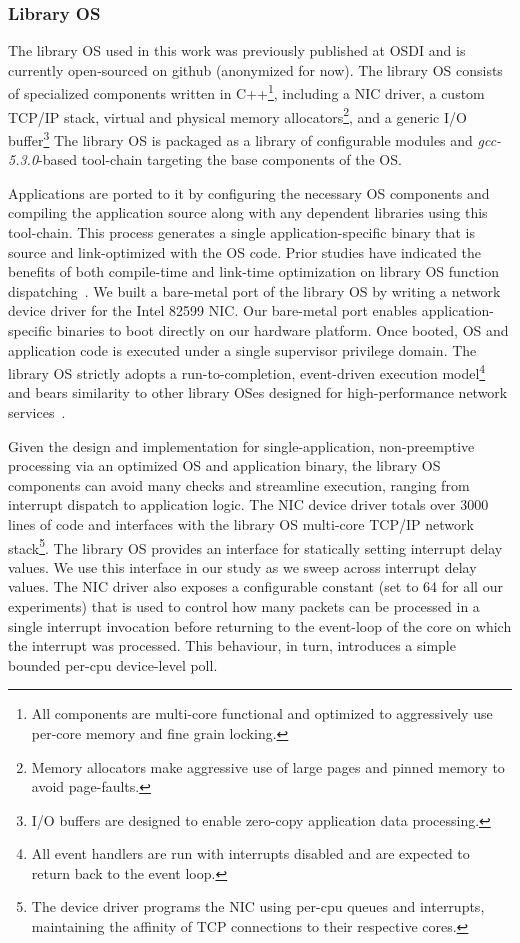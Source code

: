 \subsubsection{Library OS}
\label{sec:OS_libos}
The library OS used in this work was previously published at OSDI and is currently open-sourced on github (anonymized for now). The library OS consists of specialized components written in C++\footnote{ All components are multi-core functional and optimized to aggressively use per-core memory and fine grain locking.}, including a NIC driver, a custom TCP/IP stack, virtual and physical memory allocators\footnote{Memory allocators make aggressive use of large pages and pinned memory to avoid page-faults.}, and a generic I/O buffer\footnote{I/O buffers are designed to enable zero-copy application data processing.} The library OS is packaged as a library of configurable modules and \textit{gcc-5.3.0}-based tool-chain targeting the base components of the OS. 

Applications are ported to it by configuring the necessary OS components and compiling the application source along with any dependent libraries using this tool-chain. This process generates a single application-specific binary that is source and link-optimized with the OS code. Prior studies have indicated the benefits of both compile-time and link-time optimization on library OS function dispatching~\cite{EbbRT}. We built a bare-metal port of the library OS by writing a network device driver for the Intel 82599 NIC. Our bare-metal port enables application-specific binaries to boot directly on our hardware platform. Once booted, OS and application code is executed under a single supervisor privilege domain. The library OS strictly adopts a run-to-completion, event-driven execution model\footnote{All event handlers are run with interrupts disabled and are expected to return back to the event loop.} and bears similarity to other library OSes designed for high-performance network services~\cite{10.1145/2997641, seda, 10.1145/2812806, EbbRT}.


Given the design and implementation for single-application, non-preemptive processing via an optimized OS and application binary, the library OS components can avoid many checks and streamline execution, ranging from interrupt dispatch to application logic. The NIC device driver totals over 3000 lines of code and interfaces with the library OS multi-core TCP/IP network stack\footnote{The device driver programs the NIC using per-cpu queues and interrupts, maintaining the affinity of TCP connections to their respective cores.}. The library OS provides an interface for statically setting interrupt delay values. We use this interface in our study as we sweep across interrupt delay values. The NIC driver also exposes a configurable constant (set to 64 for all our experiments) that is used to control how many packets can be processed in a single interrupt invocation before returning to the event-loop of the core on which the interrupt was processed. This behaviour, in turn, introduces a simple bounded per-cpu device-level poll.

